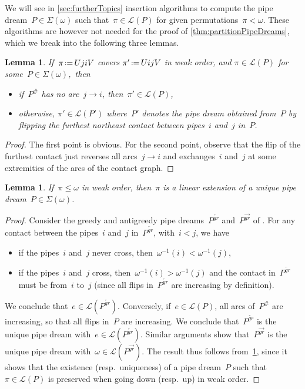 \documentclass[reqno]{amsart}
\newtheorem{lemma}[theorem]{Lemma}
\theoremstyle{definition}
\newcommand{\eqdef}{\mbox{\,\raisebox{0.2ex}{\scriptsize\ensuremath{\mathrm:}}\ensuremath{=}\,}} %
\newcommand{\contact}{^\#} %
\newcommand{\acyclicPipeDreams}{\Sigma} %
\newcommand{\linearExtensions}{\mathcal{L}} %
\newcommand{\greedyPipeDream}{P^{\overleftarrow{gr}}} %
\newcommand{\antiGreedyPipeDream}{P^{\overrightarrow{gr}}} %
\begin{document}
We will see in \cref{sec:furtherTopics} insertion algorithms to compute the pipe dream~$P \in \acyclicPipeDreams(\omega)$ such that~$\pi \in \linearExtensions(P)$ for given permutations~$\pi < \omega$.
These algorithms are however not needed for the proof of \cref{thm:partitionPipeDreams}, which we break into the following three lemmas.

\begin{lemma}
\label{lem:lowerSetPipeDreams}
If~$\pi \eqdef UjiV$ covers $\pi' \eqdef UijV$ in weak order, and ${\pi \in \linearExtensions(P)}$ for some~${P \in \acyclicPipeDreams(\omega)}$,~then
\begin{itemize}
\item if~$P\contact$ has no arc~$j \to i$, then~$\pi' \in \linearExtensions(P)$,
\item otherwise, $\pi' \in \linearExtensions(P')$ where~$P'$ denotes the pipe dream obtained from~$P$ by flipping the furthest northeast contact between pipes~$i$ and~$j$ in~$P$.
\end{itemize}
\end{lemma}

\begin{proof}
The first point is obvious.
For the second point, observe that the flip of the furthest contact just reverses all arcs~$j \to i$ and exchanges~$i$ and~$j$ at some extremities of the arcs of the contact graph.
\end{proof}

\begin{lemma}
\label{lem:partition}
If~$\pi \le \omega$ in weak order, then~$\pi$ is a linear extension of a unique pipe dream~$P \in \acyclicPipeDreams(\omega)$.
\end{lemma}

\begin{proof}
Consider the greedy and antigreedy pipe dreams~$\greedyPipeDream$ and~$\antiGreedyPipeDream$ of \cite{PilaudPocchiola}.
For any contact between the pipes~$i$ and~$j$ in~$\greedyPipeDream$, with~$i < j$, we have
\begin{itemize}
\item if the pipes~$i$ and~$j$ never cross, then~$\omega^{-1}(i) < \omega^{-1}(j)$,
\item if the pipes~$i$ and~$j$ cross, then~$\omega^{-1}(i) > \omega^{-1}(j)$ and the contact in~$\greedyPipeDream$ must be from~$i$ to~$j$ (since all flips in~$\greedyPipeDream$ are increasing by definition).
\end{itemize}
We conclude that~$e \in \linearExtensions(\greedyPipeDream)$.
Conversely, if~$e \in \linearExtensions(P)$, all arcs of~$P\contact$ are increasing, so that all flips in~$P$ are increasing.
We conclude that~$\greedyPipeDream$ is the unique pipe dream with~$e \in \linearExtensions(\greedyPipeDream)$.
Similar arguments show that~$\antiGreedyPipeDream$ is the unique pipe dream with~$\omega \in \linearExtensions(\antiGreedyPipeDream)$.
The result thus follows from~\cref{lem:lowerSetPipeDreams}, since it shows that the existence (resp.~uniqueness) of a pipe dream~$P$ such that~$\pi \in \linearExtensions(P)$ is preserved when going down (resp.~up) in weak order.
\end{proof}
\end{document}
